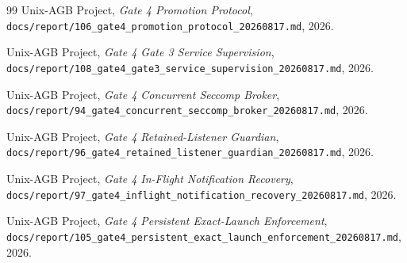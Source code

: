 \documentclass[11pt,a4paper]{article}
\begin{document}
\begin{thebibliography}{99}
Unix-AGB Project,
\emph{Gate 4 Promotion Protocol},
\texttt{docs/report/106\_gate4\_promotion\_protocol\_20260817.md}, 2026.

Unix-AGB Project,
\emph{Gate 4 Gate 3 Service Supervision},
\texttt{docs/report/108\_gate4\_gate3\_service\_supervision\_20260817.md}, 2026.

Unix-AGB Project,
\emph{Gate 4 Concurrent Seccomp Broker},
\texttt{docs/report/94\_gate4\_concurrent\_seccomp\_broker\_20260817.md}, 2026.

Unix-AGB Project,
\emph{Gate 4 Retained-Listener Guardian},
\texttt{docs/report/96\_gate4\_retained\_listener\_guardian\_20260817.md}, 2026.

Unix-AGB Project,
\emph{Gate 4 In-Flight Notification Recovery},
\texttt{docs/report/97\_gate4\_inflight\_notification\_recovery\_20260817.md}, 2026.

Unix-AGB Project,
\emph{Gate 4 Persistent Exact-Launch Enforcement},
\texttt{docs/report/105\_gate4\_persistent\_exact\_launch\_enforcement\_20260817.md}, 2026.

\end{thebibliography}
\end{document}
